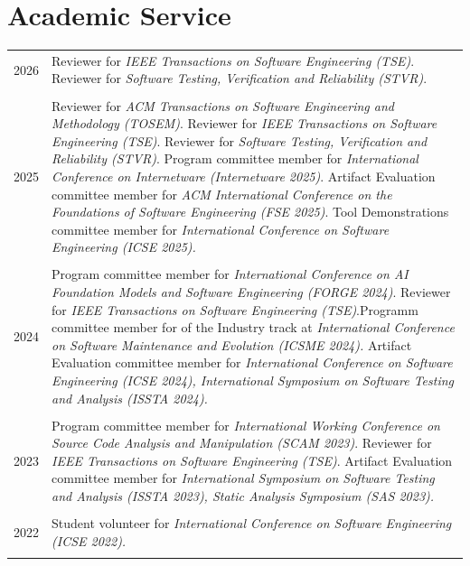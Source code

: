 \documentclass[a4paper,10pt]{article} %
\begin{document}
\section{Academic Service}
\begin{longtable}{>{\raggedleft\arraybackslash}p{} p{}}

\textsc{2026} & Reviewer for \textit{IEEE Transactions on Software Engineering (TSE)}. Reviewer for \textit{Software Testing, Verification and Reliability (STVR)}. \\ & \\

\textsc{2025} & Reviewer for \textit{ACM Transactions on Software Engineering and Methodology (TOSEM)}. Reviewer for \textit{IEEE Transactions on Software Engineering (TSE)}. Reviewer for \textit{Software Testing, Verification and Reliability (STVR)}.
Program committee member for \textit{International Conference on Internetware (Internetware 2025)}. Artifact Evaluation committee member for \textit{ACM International Conference on the Foundations of Software Engineering (FSE 2025)}.
Tool Demonstrations committee member for \textit{International Conference on Software Engineering (ICSE 2025).}
\\ & \\

\textsc{2024} & Program committee member for \textit{International Conference on AI Foundation Models and Software Engineering (FORGE 2024)}. Reviewer for \textit{IEEE Transactions on Software Engineering (TSE)}.Programm committee member for of the Industry track at \textit{International Conference on Software Maintenance and Evolution (ICSME 2024).} Artifact Evaluation committee member for \textit{International Conference on Software Engineering (ICSE 2024), International Symposium on Software Testing and Analysis (ISSTA 2024).} \\ & \\

\textsc{2023} & Program committee member for \textit{International Working Conference on Source Code Analysis and Manipulation (SCAM 2023)}. Reviewer for \textit{IEEE Transactions on Software Engineering (TSE)}. Artifact Evaluation committee member for \textit{International Symposium on Software Testing and Analysis (ISSTA 2023), Static Analysis Symposium (SAS 2023).} \\ & \\

\textsc{2022} & Student volunteer for \textit{International Conference on Software Engineering (ICSE 2022).} \\ & \\ 


\end{longtable}
\end{document}
